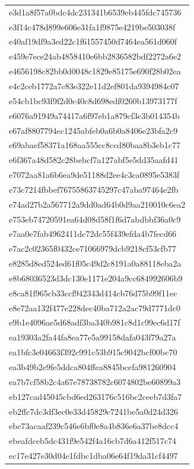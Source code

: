 \begin{tabular}{l}
e3d1a8f57a0bdc4dc231341b6539eb445fdc745736 \\
e3f14c478d899e606e31fa1f9875e4219be503038f \\
e40af19df9a3ed22c1f61557450d7464ea561d060f \\
e459e7ece24ab4858410e6bb2836582bdf2272a6e2 \\
e4656198c82bb0d0048c1829e85175e690f28b02ea \\
e4c2ceb1772a7c83e322e11d2ef801da9394984c07 \\
e54cb1bc93f9f2d0c40c8d698edf0260b13973177f \\
e6076a91949a74417a6f97eb1a879cf3c3b014354b \\
e67af8807794ec1245abfeb0a6b0a8406e23bfa2c9 \\
e69abaef58371a168aa555cc8ccd80baa8b3eb1c77 \\
e6f367a48d582c28bebcf7a127abf5e5dd35aafd41 \\
e7072aa81a6b6ea9de51188d2ee4c3ca0895e5383f \\
e73c7214fbbef76755863745297c47aba97464e2fb \\
e74ad27b2a567712a9dd0ad64b0d9aa210010c6ea2 \\
e753eb74720591ea64d08d58f1f6d7abdbbf36a0c9 \\
e7aa0e7fab4962411dc72dc55f439efda4b7fecd66 \\
e7ac2c02365f0432ce71066979dcb9218cf53cfb77 \\
e8285d8ed524ed61f05c49d2c8191a0a88118eba2a \\
e8b68036523d3dc130e1171e204a9cc684992606b9 \\
e8ca81f965cb33ccf942343d414cb76d75b99f11ec \\
e8e72aa132f477e228dec40ba712a2ac79d7771dc0 \\
e9b1e4096ae5d68adf3ba340b981c8d1c99ec6d17f \\
ea19303a2fa44fa8ea77e5a99158dafa043f79a27a \\
ea1bfc3e04663f392c991c53b915c9042bcf00bc70 \\
ea3b49b2e9fe5ddca804ffea8845bcefa981260904 \\
ea7b7cf58b2c4a67e78738782c6074802be60899a3 \\
eb127cad45045cbd6ed263176c516bc2ceeb7d3fa7 \\
eb2ffc7dc3df3ec0e33d45829c7241be5a0d24d326 \\
ebc73acaaf239c546e6bf0e8a4b836e6a37be8dcc4 \\
ebeafdceb5dc431f9e542f4a16cb7d6a412f517c74 \\
ec17e427e30d04e1fdbc1dba06e64f19da31cf4497 \\

\end{tabular}
